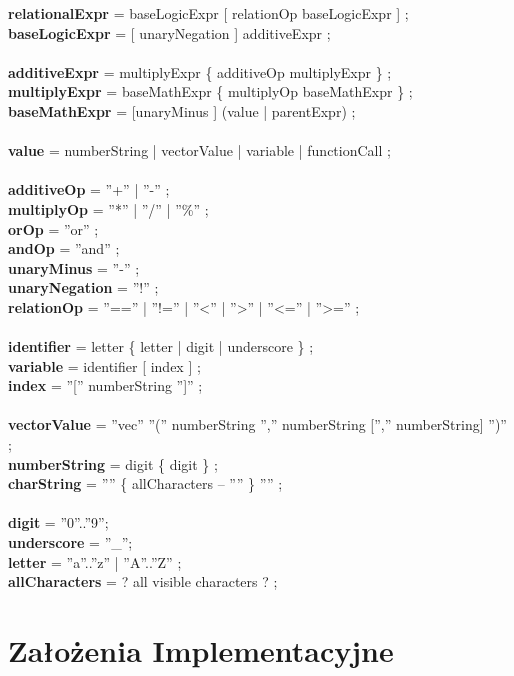 \documentclass[11pt]{article} %
\begin{document}
{\textbf{relationalExpr} = baseLogicExpr [ relationOp baseLogicExpr ] ;\\
\textbf{baseLogicExpr} = [ unaryNegation ] additiveExpr ;\\
\\
\textbf{additiveExpr} = multiplyExpr \{ additiveOp multiplyExpr \} ;\\
\textbf{multiplyExpr} = baseMathExpr \{ multiplyOp baseMathExpr \} ;\\
\textbf{baseMathExpr} = [unaryMinus ] (value | parentExpr) ;\\
\\
\textbf{value} = numberString | vectorValue | variable | functionCall ;\\
\\
\textbf{additiveOp} = ''+'' | ''-­'' ;\\
\textbf{multiplyOp} = ''*'' | ''/'' | ''\%'' ;\\
\textbf{orOp} = ''or'' ;\\
\textbf{andOp} = ''and'' ;\\
\textbf{unaryMinus} = ''-'' ;\\
\textbf{unaryNegation} = ''!'' ;\\
\textbf{relationOp} = ''=='' | ''!='' | ''<'' | ''>'' | ''<='' | ''>='' ;\\
\\
\textbf{identifier} = letter \{ letter | digit | underscore \} ;\\
\textbf{variable} = identifier [ index ] ;\\
\textbf{index} = ''['' numberString '']'' ;\\
\\
\textbf{vectorValue} = ''vec'' ''('' numberString '','' numberString ['','' numberString] '')'' ;\\ 
\textbf{numberString} = digit \{ digit \} ;\\
\textbf{charString} = '''' \{ allCharacters – '''' \} '''' ;\\
\\
\textbf{digit} = ''0''..''9'';\\
\textbf{underscore} = ''\_'';\\
\textbf{letter} = ''a''..''z'' | ''A''..''Z'' ;\\
\textbf{allCharacters} = ? all visible characters ? ;\\
}
\section{Założenia Implementacyjne}
\end{document}

